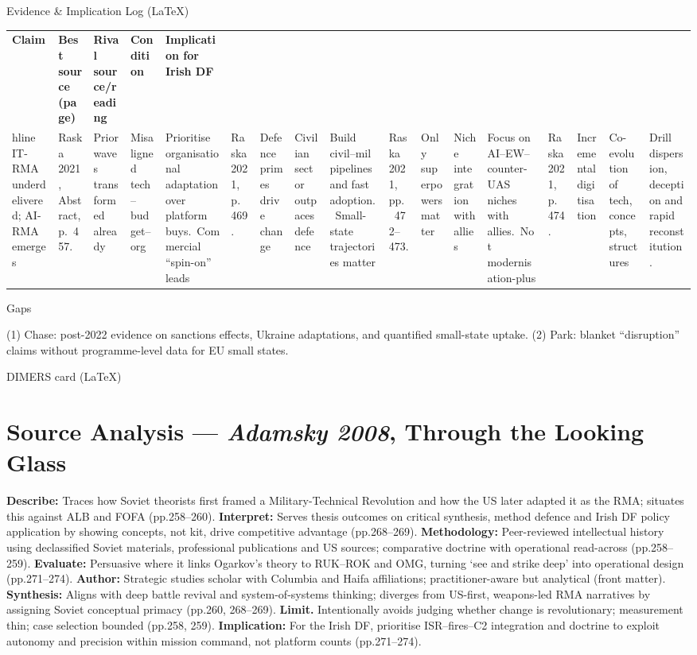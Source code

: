 Evidence & Implication Log (LaTeX)

\usepackage{array}
\begin{tabular}{p{3.2cm}p{4.2cm}p{3.6cm}p{3.2cm}p{4.2cm}}
	\textbf{Claim} & \textbf{Best source (page)} & \textbf{Rival source/reading} & \textbf{Condition} & \textbf{Implication for Irish DF}\\hline
	IT-RMA underdelivered; AI-RMA emerges & Raska 2021, Abstract, p.~457. & Prior waves transformed already & Misaligned tech–budget–org & Prioritise organisational adaptation over platform buys.\
	Commercial “spin-on” leads & Raska 2021, p.~469. & Defence primes drive change & Civilian sector outpaces defence & Build civil–mil pipelines and fast adoption.\
	Small-state trajectories matter & Raska 2021, pp.~472–473. & Only superpowers matter & Niche integration with allies & Focus on AI–EW–counter-UAS niches with allies.\
	Not modernisation-plus & Raska 2021, p.~474. & Incremental digitisation & Co-evolution of tech, concepts, structures & Drill dispersion, deception and rapid reconstitution.\
\end{tabular}

Gaps

(1) Chase: post-2022 evidence on sanctions effects, Ukraine adaptations, and quantified small-state uptake.
(2) Park: blanket “disruption” claims without programme-level data for EU small states.

\parencite{ADAMSKY_2008}
DIMERS card (LaTeX)

\section*{Source Analysis — \textit{Adamsky 2008}, Through the Looking Glass}
\textbf{Describe:} Traces how Soviet theorists first framed a Military-Technical Revolution and how the US later adapted it as the RMA; situates this against ALB and FOFA (pp.258–260).
\textbf{Interpret:} Serves thesis outcomes on critical synthesis, method defence and Irish DF policy application by showing concepts, not kit, drive competitive advantage (pp.268–269).
\textbf{Methodology:} Peer-reviewed intellectual history using declassified Soviet materials, professional publications and US sources; comparative doctrine with operational read-across (pp.258–259).
\textbf{Evaluate:} Persuasive where it links Ogarkov’s theory to RUK–ROK and OMG, turning ‘see and strike deep’ into operational design (pp.271–274).
\textbf{Author:} Strategic studies scholar with Columbia and Haifa affiliations; practitioner-aware but analytical (front matter).
\textbf{Synthesis:} Aligns with deep battle revival and system-of-systems thinking; diverges from US-first, weapons-led RMA narratives by assigning Soviet conceptual primacy (pp.260, 268–269).
\textbf{Limit.} Intentionally avoids judging whether change is revolutionary; measurement thin; case selection bounded (pp.258, 259).
\textbf{Implication:} For the Irish DF, prioritise ISR–fires–C2 integration and doctrine to exploit autonomy and precision within mission command, not platform counts (pp.271–274).

